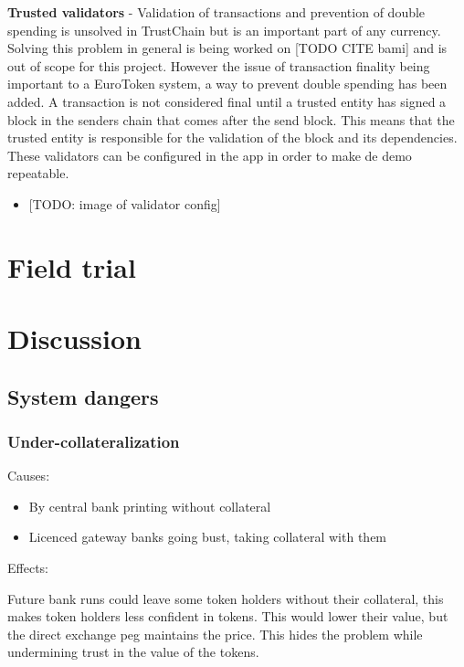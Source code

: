 \documentclass[whitelogo]{tudelft-report}
\providecommand{\tightlist}{%
  \setlength{\itemsep}{0pt}\setlength{\parskip}{0pt}}
\begin{document}
\textbf{Trusted validators} - Validation of transactions and prevention
of double spending is unsolved in TrustChain but is an important part of
any currency. Solving this problem in general is being worked on {[}TODO
CITE bami{]} and is out of scope for this project. However the issue of
transaction finality being important to a EuroToken system, a way to
prevent double spending has been added. A transaction is not considered
final until a trusted entity has signed a block in the senders chain
that comes after the send block. This means that the trusted entity is
responsible for the validation of the block and its dependencies. These
validators can be configured in the app in order to make de demo
repeatable.

\begin{itemize}
\tightlist
\item
  {[}TODO: image of validator config{]}
\end{itemize}

\chapter{Field trial}\label{field-trial}

\chapter{Discussion}\label{discussion}

\section{System dangers}\label{system-dangers}

\subsection{Under-collateralization}\label{under-collateralization}

Causes:

\begin{itemize}
\tightlist
\item
  By central bank printing without collateral
\item
  Licenced gateway banks going bust, taking collateral with them
\end{itemize}

Effects:

Future bank runs could leave some token holders without their
collateral, this makes token holders less confident in tokens. This
would lower their value, but the direct exchange peg maintains the
price. This hides the problem while undermining trust in the value of
the tokens.
\end{document}
